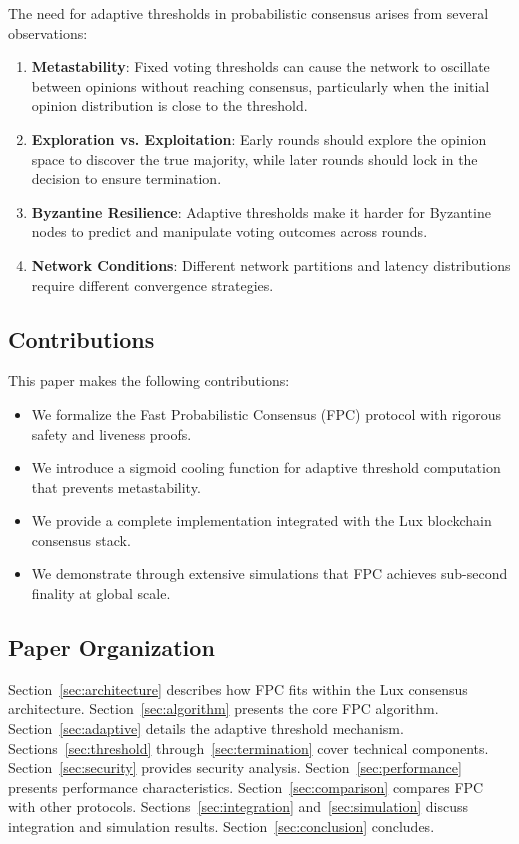 \documentclass[11pt,a4paper]{article}
\begin{document}
The need for adaptive thresholds in probabilistic consensus arises from several observations:

\begin{enumerate}
\item \textbf{Metastability}: Fixed voting thresholds can cause the network to oscillate between opinions without reaching consensus, particularly when the initial opinion distribution is close to the threshold.

\item \textbf{Exploration vs. Exploitation}: Early rounds should explore the opinion space to discover the true majority, while later rounds should lock in the decision to ensure termination.

\item \textbf{Byzantine Resilience}: Adaptive thresholds make it harder for Byzantine nodes to predict and manipulate voting outcomes across rounds.

\item \textbf{Network Conditions}: Different network partitions and latency distributions require different convergence strategies.
\end{enumerate}

\subsection{Contributions}

This paper makes the following contributions:

\begin{itemize}
\item We formalize the Fast Probabilistic Consensus (FPC) protocol with rigorous safety and liveness proofs.
\item We introduce a sigmoid cooling function for adaptive threshold computation that prevents metastability.
\item We provide a complete implementation integrated with the Lux blockchain consensus stack.
\item We demonstrate through extensive simulations that FPC achieves sub-second finality at global scale.
\end{itemize}

\subsection{Paper Organization}

Section~\ref{sec:architecture} describes how FPC fits within the Lux consensus architecture. Section~\ref{sec:algorithm} presents the core FPC algorithm. Section~\ref{sec:adaptive} details the adaptive threshold mechanism. Sections~\ref{sec:threshold} through~\ref{sec:termination} cover technical components. Section~\ref{sec:security} provides security analysis. Section~\ref{sec:performance} presents performance characteristics. Section~\ref{sec:comparison} compares FPC with other protocols. Sections~\ref{sec:integration} and~\ref{sec:simulation} discuss integration and simulation results. Section~\ref{sec:conclusion} concludes.
\end{document}
